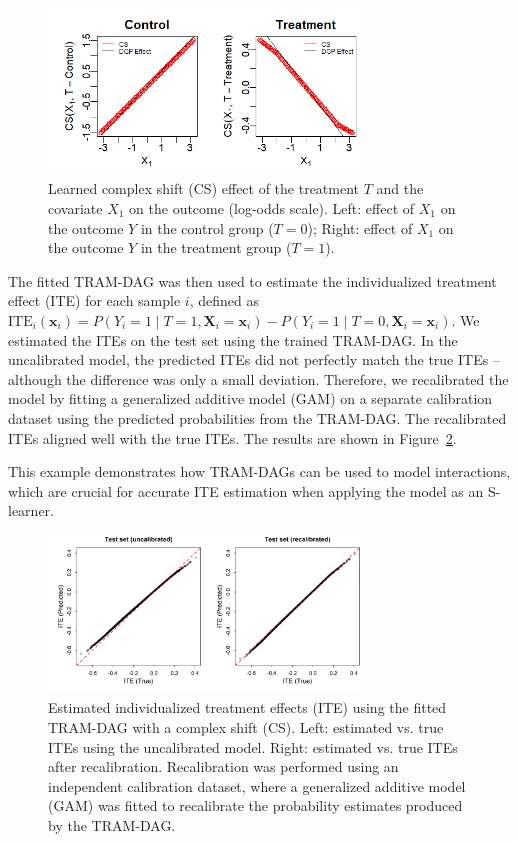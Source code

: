\begin{figure}[htbp]
\centering
\includegraphics[width=0.75\textwidth]{img/appendix_CS_T_X1_interaction.png}
\caption{Learned complex shift (CS) effect of the treatment $T$ and the covariate $X_1$ on the outcome (log-odds scale). Left: effect of $X_1$ on the outcome $Y$ in the control group ($T=0$); Right: effect of $X_1$ on the outcome $Y$ in the treatment group ($T=1$).}
\label{fig:CS_interaction}
\end{figure}


The fitted TRAM-DAG was then used to estimate the individualized treatment effect (ITE) for each sample $i$, defined as $\text{ITE}_i(\mathbf{x}_i) = P(Y_i = 1 \mid T = 1, \mathbf{X}_i = \mathbf{x}_i) - P(Y_i = 1 \mid T = 0, \mathbf{X}_i = \mathbf{x}_i)$. We estimated the ITEs on the test set using the trained TRAM-DAG. In the uncalibrated model, the predicted ITEs did not perfectly match the true ITEs -- although the difference was only a small deviation. Therefore, we recalibrated the model by fitting a generalized additive model (GAM) on a separate calibration dataset using the predicted probabilities from the TRAM-DAG. The recalibrated ITEs aligned well with the true ITEs. The results are shown in Figure~\ref{fig:ITE_interaction}.

This example demonstrates how TRAM-DAGs can be used to model interactions, which are crucial for accurate ITE estimation when applying the model as an S-learner.


\begin{figure}[htbp]
\centering
\includegraphics[width=0.75\textwidth]{img/appendix_ITE_recal.png}
\caption{Estimated individualized treatment effects (ITE) using the fitted TRAM-DAG with a complex shift (CS). Left: estimated vs. true ITEs using the uncalibrated model. Right: estimated vs. true ITEs after recalibration. Recalibration was performed using an independent calibration dataset, where a generalized additive model (GAM) was fitted to recalibrate the probability estimates produced by the TRAM-DAG.}
\label{fig:ITE_interaction}
\end{figure}



